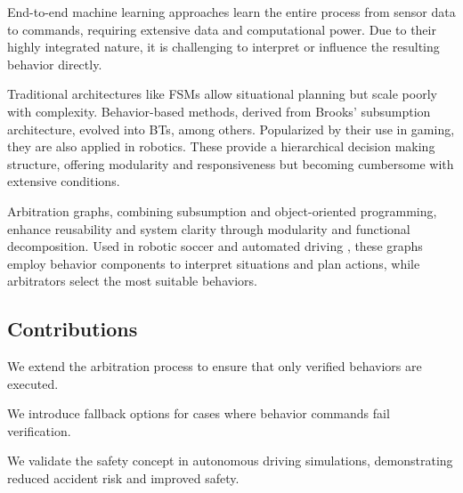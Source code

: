 End-to-end machine learning approaches learn the entire process from sensor data to commands, requiring extensive data and computational power.
Due to their highly integrated nature, it is challenging to interpret or influence the resulting behavior directly.

Traditional architectures like \glspl{FSM} allow situational planning but scale poorly with complexity. Behavior-based methods, derived from Brooks' subsumption architecture, evolved into \glspl{BT}, among others. Popularized by their use in gaming, they are also applied in robotics. These provide a hierarchical decision making structure, offering modularity and responsiveness but becoming cumbersome with extensive conditions.

Arbitration graphs, combining subsumption and object-oriented programming, enhance reusability and system clarity through modularity and functional decomposition. Used in robotic soccer \cite{lauerCognitiveConceptsAutonomous2010} and automated driving \cite{orzechowskiDecisionMakingAutomatedVehicles2020a}, these graphs employ behavior components to interpret situations and plan actions, while arbitrators select the most suitable behaviors.

\subsection{Contributions}

\begin{description}[align=left]
    \item[Verification Logic] We extend the arbitration process to ensure that only verified behaviors are executed.
    \item[Fallback Logic] We introduce fallback options for cases where behavior commands fail verification.
    \item[Application] We validate the safety concept in autonomous driving simulations, demonstrating reduced accident risk and improved safety.
\end{description}
